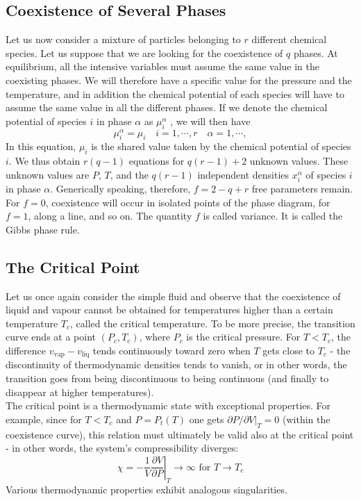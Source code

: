 \subsection{Coexistence of Several Phases}
Let us now consider a mixture of particles belonging to $r$ different chemical species. Let us suppose that we are looking for the coexistence of $q$ phases. At equilibrium, all the intensive variables must assume the same value in the coexisting phases. We will therefore have a specific value for the pressure and the temperature, and in addition the chemical potential of each species will have to assume the same value in all the different phases. If we denote the chemical potential of species $i$ in phase $\alpha$ as $\mu_i^{\alpha}$ , we will then have
\[\mu_{i}^{\alpha} = \mu_i \quad i = 1,\cdots,r \quad \alpha = 1,\cdots,\]
In this equation, $\mu_i$ is the shared value taken by the chemical potential of species $i$. We
thus obtain $r(q-1)$ equations for $q(r-1)+2$ unknown values. These unknown values are $P$, $T$, and the $q(r-1)$ independent densities $x_i^{\alpha}$ of species $i$ in phase $\alpha$. Generically speaking, therefore, $f = 2 - q + r$ free parameters remain. For $f = 0$, coexistence will occur in isolated points of the phase diagram, for $f = 1$, along a line, and so on. The quantity $f$ is called variance.  It is called the Gibbs phase rule.

\subsection{The Critical Point}
Let us once again consider the simple fluid and observe that the coexistence of liquid and vapour cannot be obtained for temperatures higher than a certain temperature $T_c$, called the critical temperature. To be more precise, the transition curve ends at a point $(P_c,T_c)$, where $P_c$ is the critical pressure. For $T < T_c$, the difference $v_{\mathrm{vap}}-v_{\mathrm{liq}}$ tends continuously toward zero when $T$ gets close to $T_c$ - the discontinuity of thermodynamic densities tends to vanish, or in other words, the transition goes from being discontinuous to being continuous (and finally to disappear at higher temperatures).
\\
The critical point is a thermodynamic state with exceptional properties. For example, since for $T < T_c$ and $P = P_t(T)$ one gets $\partial P / \partial V |_{T} = 0$ (within the coexistence curve), this relation must ultimately be valid also at the critical point - in other words, the system's compressibility diverges:
\[\chi = - \frac{1}{V} \left. \frac{\partial V}{\partial P} \right|_{T} \to \infty \mbox{ for } T \to T_c \]
Various thermodynamic properties exhibit analogous singularities.


